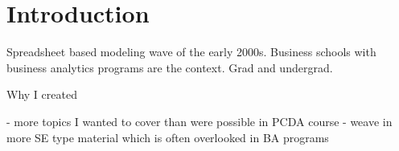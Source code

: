\documentclass[ited,blindrev]{informs3}              %
\begin{document}
%


\section{Introduction}

Spreadsheet based modeling wave of the early 2000s. Business schools with business analytics programs are the context. Grad and undergrad.

Why I created 

- more topics I wanted to cover than were possible in PCDA course
- weave in more SE type material which is often overlooked in BA programs
\end{document}
